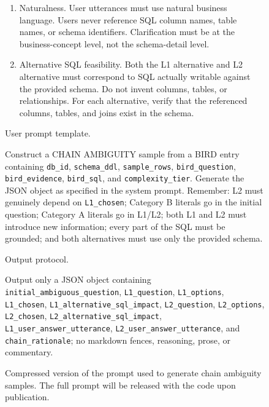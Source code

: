 \begin{figure}[t]
\begin{tcolorbox}[
  width=1.03\textwidth,
  enhanced,
  colback=white,
  colframe=black,
  boxrule=0.5pt,
  arc=0.8mm,
  left=1.6mm,
  right=1.6mm,
  top=1.3mm,
  bottom=1.3mm
]
\begin{enumerate}[leftmargin=1.8em,itemsep=0.22em,topsep=0.15em,label=C\arabic*.]
    \item Naturalness.
    User utterances must use natural business language. Users never reference SQL
    column names, table names, or schema identifiers. Clarification must be at
    the business-concept level, not the schema-detail level.

    \item Alternative SQL feasibility.
    Both the L1 alternative and L2 alternative must correspond to SQL actually
    writable against the provided schema. Do not invent columns, tables, or
    relationships. For each alternative, verify that the referenced columns,
    tables, and joins exist in the schema.
\end{enumerate}

\vspace{0.35em}
\noindent User prompt template.

\noindent
Construct a CHAIN AMBIGUITY sample from a BIRD entry containing
\texttt{db\_id}, \texttt{schema\_ddl}, \texttt{sample\_rows},
\texttt{bird\_question}, \texttt{bird\_evidence}, \texttt{bird\_sql}, and
\texttt{complexity\_tier}. Generate the JSON object as specified in the system
prompt. Remember: L2 must genuinely depend on \texttt{L1\_chosen}; Category B
literals go in the initial question; Category A literals go in L1/L2; both L1 and
L2 must introduce new information; every part of the SQL must be grounded; and
both alternatives must use only the provided schema.

\vspace{0.35em}
\noindent Output protocol.

\noindent
Output only a JSON object containing
\texttt{initial\_ambiguous\_question}, \texttt{L1\_question},
\texttt{L1\_options}, \texttt{L1\_chosen},
\texttt{L1\_alternative\_sql\_impact}, \texttt{L2\_question},
\texttt{L2\_options}, \texttt{L2\_chosen},
\texttt{L2\_alternative\_sql\_impact},
\texttt{L1\_user\_answer\_utterance},
\texttt{L2\_user\_answer\_utterance}, and
\texttt{chain\_rationale}; no markdown fences, reasoning, prose, or commentary.

\end{tcolorbox}
\caption{Compressed version of the prompt used to generate chain ambiguity
samples. The full prompt will be released with the code upon publication.}
\label{fig:chain-prompt}
\end{figure}


